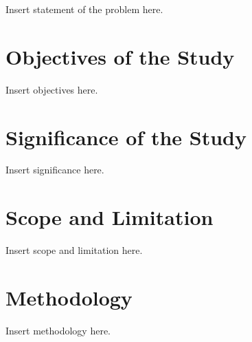 Insert statement of the problem here.

\section{Objectives of the Study}

Insert objectives here.

\section{Significance of the Study}

Insert significance here.

\section{Scope and Limitation}

Insert scope and limitation here.

\section{Methodology}

Insert methodology here.